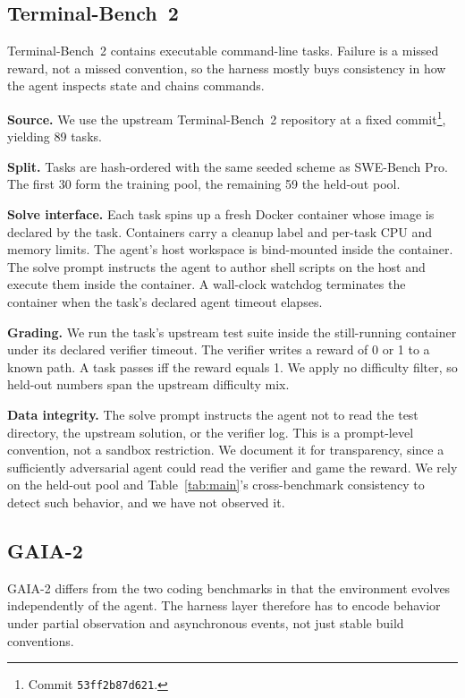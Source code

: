 \subsection{Terminal-Bench~2}

Terminal-Bench~2 \citep{terminalbench2} contains executable command-line tasks. Failure is a missed reward, not a missed convention, so the harness mostly buys consistency in how the agent inspects state and chains commands.

\noindent\textbf{Source.}
We use the upstream Terminal-Bench~2 repository at a fixed commit\footnote{Commit \texttt{53ff2b87d621}.}, yielding 89 tasks.

\noindent\textbf{Split.}
Tasks are hash-ordered with the same seeded scheme as SWE-Bench Pro.
The first 30 form the training pool, the remaining 59 the held-out pool.

\noindent\textbf{Solve interface.}
Each task spins up a fresh Docker container whose image is declared by the task.
Containers carry a cleanup label and per-task CPU and memory limits.
The agent's host workspace is bind-mounted inside the container.
The solve prompt instructs the agent to author shell scripts on the host and execute them inside the container.
A wall-clock watchdog terminates the container when the task's declared agent timeout elapses.

\noindent\textbf{Grading.}
We run the task's upstream test suite inside the still-running container under its declared verifier timeout.
The verifier writes a reward of 0 or 1 to a known path.
A task passes iff the reward equals 1.
We apply no difficulty filter, so held-out numbers span the upstream difficulty mix.

\noindent\textbf{Data integrity.}
The solve prompt instructs the agent not to read the test directory, the upstream solution, or the verifier log.
This is a prompt-level convention, not a sandbox restriction.
We document it for transparency, since a sufficiently adversarial agent could read the verifier and game the reward.
We rely on the held-out pool and Table~\ref{tab:main}'s cross-benchmark consistency to detect such behavior, and we have not observed it.

\subsection{GAIA-2}

 GAIA-2 \citep{froger2026gaia2} differs from the two coding benchmarks in that the environment evolves independently of the agent.
The harness layer therefore has to encode behavior under partial observation and asynchronous events, not just stable build conventions.

